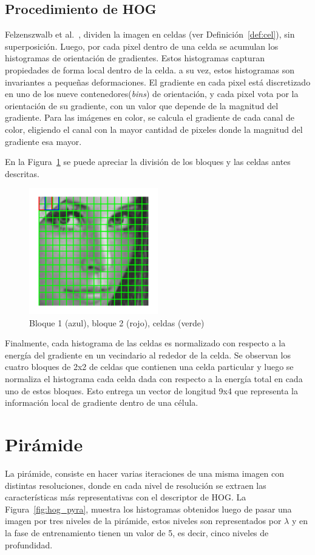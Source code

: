 \subsection{Procedimiento de HOG}
Felzenszwalb et al.~\cite{Felzenszwalb2010}, dividen la imagen en celdas (ver Definición~\ref{def:cel}), sin superposición. Luego, por cada pixel dentro de una celda se acumulan los histogramas de orientación de gradientes. Estos histogramas capturan propiedades de forma local dentro de la celda. a su vez, estos histogramas son invariantes a pequeñas deformaciones.
El gradiente en cada pixel está discretizado en uno de los nueve contenedores(\textit{bins}) de orientación, y cada pixel vota por la orientación de su gradiente, con un valor que depende de la magnitud del gradiente. Para las imágenes en color, se calcula el gradiente de cada canal de color, eligiendo el canal con la mayor cantidad de pixeles donde la magnitud del gradiente esa mayor.

En la Figura~\ref{fig:blocks_cells} se puede apreciar la división de los bloques y las celdas antes descritas.

\begin{figure}[tb]
  \centering
   \includegraphics[width=0.5\textwidth]{Figuras/lena-grid.png}
   \caption{Bloque 1 (azul), bloque 2 (rojo), celdas (verde)}
   \label{fig:blocks_cells}
\end{figure}

Finalmente, cada histograma de las celdas es normalizado con respecto a la energía del gradiente en un vecindario al rededor de la celda. Se observan los cuatro bloques de 2x2 de celdas que contienen una celda particular y luego se normaliza el histograma cada celda dada con respecto a la energía total en cada uno de estos bloques. Esto entrega un vector de longitud 9x4 que representa la información local de gradiente dentro de una célula.
\section{Pirámide}\label{sec:pyra}
La pirámide, consiste en hacer varias iteraciones de una misma imagen con distintas resoluciones, donde en cada nivel de resolución se extraen las características más representativas con el descriptor de HOG. La Figura~\ref{fig:hog_pyra}, muestra los histogramas obtenidos luego de pasar una imagen por tres niveles de la pirámide, estos niveles son representados por $\lambda$ y en la fase de entrenamiento tienen un valor de 5, es decir, cinco niveles de profundidad.

